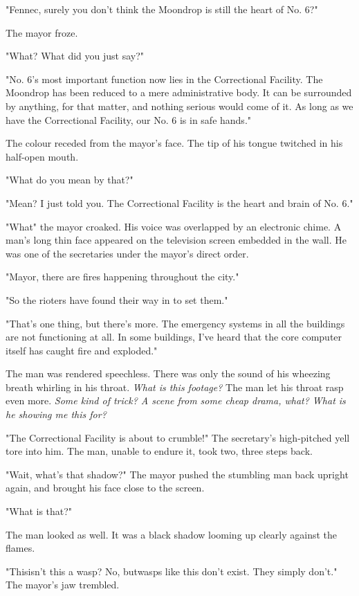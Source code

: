 "Fennec, surely you don't think the Moondrop is still the heart of No.
6?"

The mayor froze.

"What? What did you just say?"

"No. 6's most important function now lies in the Correctional Facility.
The Moondrop has been reduced to a mere administrative body. It can be
surrounded by anything, for that matter, and nothing serious would come
of it. As long as we have the Correctional Facility, our No. 6 is in
safe hands."

The colour receded from the mayor's face. The tip of his tongue twitched
in his half-open mouth.

"What do you mean by that?"

"Mean? I just told you. The Correctional Facility is the heart and brain
of No. 6."

"What\el " the mayor croaked. His voice was overlapped by an electronic
chime. A man's long thin face appeared on the television screen embedded
in the wall. He was one of the secretaries under the mayor's direct
order.

"Mayor, there are fires happening throughout the city."

"So the rioters have found their way in to set them."

"That's one thing, but there's more. The emergency systems in all the
buildings are not functioning at all. In some buildings, I've heard that
the core computer itself has caught fire and exploded."

The man was rendered speechless. There was only the sound of his
wheezing breath whirling in his throat. \emph{What is this footage?} The man
let his throat rasp even more. \emph{Some kind of trick? A scene from some
cheap drama, what? What is he showing me this for?}

"The Correctional Facility is about to crumble!" The secretary's
high-pitched yell tore into him. The man, unable to endure it, took two,
three steps back.

"Wait, what's that shadow?" The mayor pushed the stumbling man back
upright again, and brought his face close to the screen.

"What is that?"

The man looked as well. It was a black shadow looming up clearly against
the flames.

"This\el isn't this a wasp? No, but\el wasps like this don't exist. They
simply don't." The mayor's jaw trembled.

